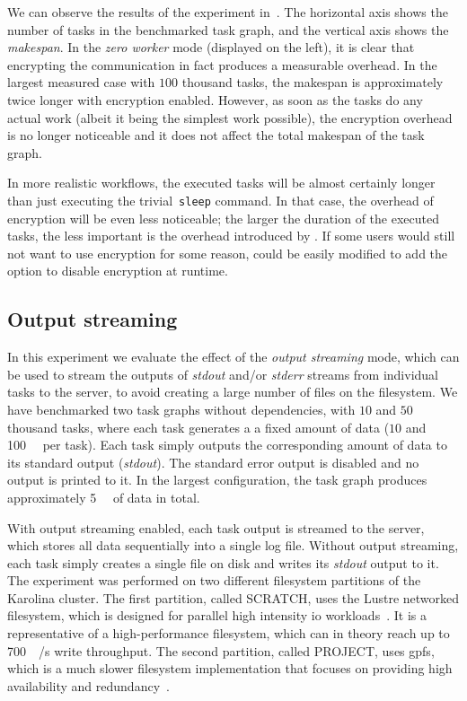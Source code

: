 We can observe the results of the experiment in~. The horizontal axis shows
the number of tasks in the benchmarked task graph, and the vertical axis shows the
\emph{makespan}. In the \emph{zero worker} mode (displayed on the left), it is clear
that encrypting the communication in fact produces a measurable overhead. In the largest measured
case with $100$ thousand tasks, the makespan is approximately twice longer with
encryption enabled. However, as soon as the tasks do any actual work (albeit it being the simplest
work possible), the encryption overhead is no longer noticeable and it does not affect the total
makespan of the task graph.

In more realistic workflows, the executed tasks will be almost certainly longer than just executing
the trivial~\texttt{sleep} command. In that case, the overhead of encryption will be even
less noticeable; the larger the duration of the executed tasks, the less important is the overhead
introduced by \hyperqueue{}. If some users would still not want to use encryption for
some reason, \hyperqueue{} could be easily modified to add the option to disable
encryption at runtime.

\subsection{Output streaming}
\label{sec:hq-exp-output-streaming}
In this experiment we evaluate the effect of the \emph{output streaming} mode, which can be used to
stream the outputs of \emph{stdout} and/or \emph{stderr} streams from
individual tasks to the \hyperqueue{} server, to avoid creating a large number of files
on the filesystem. We have benchmarked two task graphs without dependencies, with
$10$ and $50$ thousand tasks, where each task generates a a
fixed amount of data ($10$ and \SI{100}{\kibi\byte} per task). Each task
simply outputs the corresponding amount of data to its standard output (\emph{stdout}).
The standard error output is disabled and no output is printed to it. In the largest configuration,
the task graph produces approximately \SI{5}{\gibi\byte} of data in total.

With output streaming enabled, each task output is streamed to the server, which stores all data
sequentially into a single log file. Without output streaming, each task simply creates a single
file on disk and writes its \emph{stdout} output to it. The experiment was performed on
two different filesystem partitions of the Karolina cluster. The first partition, called SCRATCH,
uses the Lustre networked filesystem, which is designed for parallel high intensity
\gls{io} workloads~\cite{karolina_scratch}. It is a representative of a
high-performance filesystem, which can in theory reach up to \SI{700}{\gibi\byte}/s write
throughput. The second partition, called PROJECT, uses \gls{gpfs}, which is a much
slower filesystem implementation that focuses on providing high availability and
redundancy~\cite{karolina_project}.

